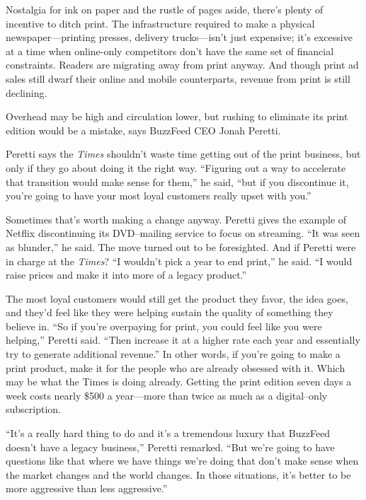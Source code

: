 Nostalgia for ink on paper and the rustle of pages aside, there's
plenty of incentive to ditch print. The infrastructure required to make
a physical newspaper---printing presses, delivery trucks---isn't just
expensive; it's excessive at a time when online-only competitors
don't have the same set of financial constraints. Readers are migrating
away from print anyway. And though print ad sales still dwarf their
online and mobile counterparts, revenue from print is still declining.

Overhead may be high and circulation lower, but rushing to
eliminate its print edition would be a mistake, says BuzzFeed CEO Jonah
Peretti.

Peretti says the \emph{Times} shouldn't waste time getting out of the
print business, but only if they go about doing it the right way.
``Figuring out a way to accelerate that transition would make sense for
them,'' he said, ``but if you discontinue it, you're going to have
your most loyal customers really upset with you.''

Sometimes that's worth making a change anyway. Peretti gives the
example of Netflix discontinuing its DVD--mailing service to focus on
streaming. ``It was seen as blunder,'' he said. The move turned out
to be foresighted. And if Peretti were in charge at the \emph{Times}? ``I
wouldn't pick a year to end print,'' he said. ``I would raise prices
and make it into more of a legacy product.''

The most loyal customers would still get the product they favor, the
idea goes, and they'd feel like they were helping sustain the quality
of something they believe in. ``So if you're overpaying for print, you
could feel like you were helping,'' Peretti said. ``Then increase it
at a higher rate each year and essentially try to generate additional
revenue.'' In other words, if you're going to make a print product,
make it for the people who are already obsessed with it. Which may be
what the Times is doing already. Getting the print edition seven days a
week costs nearly \$500 a year---more than twice as much as a digital--only subscription.

``It's a really hard thing to do and it's a tremendous luxury that
BuzzFeed doesn't have a legacy business,'' Peretti remarked. ``But
we're going to have questions like that where we have things we're doing
that don't make sense when the market changes and the world changes. In
those situations, it's better to be more aggressive than less
aggressive.''


